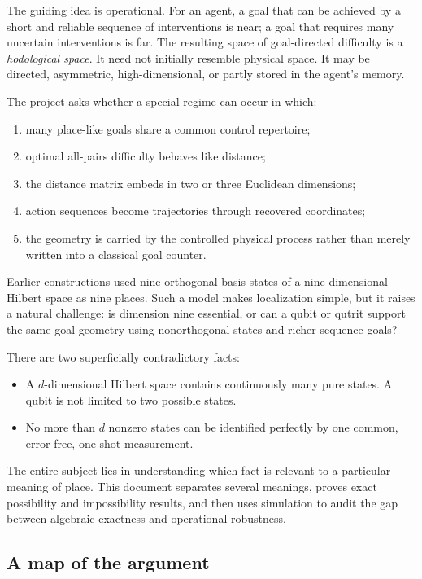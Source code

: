 \documentclass[11pt]{article}
\theoremstyle{definition}
\theoremstyle{remark}
\begin{document}
The guiding idea is operational. For an agent, a goal that can be achieved by
a short and reliable sequence of interventions is near; a goal that requires
many uncertain interventions is far. The resulting space of goal-directed
difficulty is a \emph{hodological space}. It need not initially resemble
physical space. It may be directed, asymmetric, high-dimensional, or partly
stored in the agent's memory.

The project asks whether a special regime can occur in which:
\begin{enumerate}
  \item many place-like goals share a common control repertoire;
  \item optimal all-pairs difficulty behaves like distance;
  \item the distance matrix embeds in two or three Euclidean dimensions;
  \item action sequences become trajectories through recovered coordinates;
  \item the geometry is carried by the controlled physical process rather than
  merely written into a classical goal counter.
\end{enumerate}



Earlier constructions used nine orthogonal basis states of a
nine-dimensional Hilbert space as nine places. Such a model makes
localization simple, but it raises a natural challenge: is dimension nine
essential, or can a qubit or qutrit support the same goal geometry using
nonorthogonal states and richer sequence goals?

There are two superficially contradictory facts:
\begin{itemize}
  \item A $d$-dimensional Hilbert space contains continuously many pure states.
  A qubit is not limited to two possible states.
  \item No more than $d$ nonzero states can be identified perfectly by one
  common, error-free, one-shot measurement.
\end{itemize}

The entire subject lies in understanding which fact is relevant to a
particular meaning of place. This document separates several meanings, proves
exact possibility and impossibility results, and then uses simulation to audit
the gap between algebraic exactness and operational robustness.

\subsection{A map of the argument}
\end{document}
